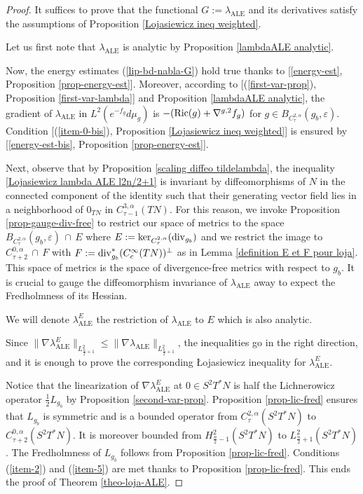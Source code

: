 \documentclass[a4paper,11pt,reqno]{amsart}
\def\Ric{\mathop{\rm Ric}\nolimits}
\def\div{\mathop{\rm div}\nolimits}
\def\Ric{\mathop{\rm Ric}\nolimits}
\def\div{\mathop{\rm div}\nolimits}
\numberwithin{equation}{section}
\begin{document}
	\begin{proof}
		It suffices to prove that the functional $G:=\lambda_{\operatorname{ALE}}$ and its derivatives satisfy the assumptions of Proposition \ref{Lojasiewicz ineq weighted}.
		
		Let us first note that $\lambda_{\operatorname{ALE}}$ is analytic by Proposition \ref{lambdaALE analytic}.
		
		Now, the energy estimates (\ref{lip-bd-nabla-G}) hold true thanks to [\eqref{energy-est}, Proposition \ref{prop-energy-est}]. 
		Moreover, according to [(\ref{first-var-prop}), Proposition \ref{first-var-lambda}] and Proposition \ref{lambdaALE analytic}, the gradient of $\lambda_{\operatorname{ALE}}$ in $L^2(e^{-f_g}d\mu_g)$ is $-(\Ric(g) + \nabla^{g,2}f_g)$ for $g\in B_{C^{2,\alpha}_{\tau}}(g_b,\varepsilon)$. Condition [(\ref{item-0-bis}), Proposition \ref{Lojasiewicz ineq weighted}] is ensured by [\eqref{energy-est-bis}, Proposition \ref{prop-energy-est}].
		
		Next, observe that by Proposition \ref{scaling diffeo tildelambda}, the inequality \eqref{Lojasiewicz lambda ALE l2n/2+1} is invariant by diffeomorphisms of $N$ in the connected component of the identity such that their generating vector field lies in a neighborhood of $0_{TN}$ in $C^{3,\alpha}_{\tau-1}(TN)$. For this reason, we invoke Proposition \ref{prop-gauge-div-free} to restrict our space of metrics to the space $B_{C^{2,\alpha}_{\tau}}(g_b,\varepsilon)\,\cap\,E$ where $E:= \ker_{C^{2,\alpha}_{\tau}}(\div_{g_b})$ and we restrict the image to $C^{0,\alpha}_{\tau+2}\,\cap \,F$ with $F:=\div^*_{g_b}(C^\infty_c(TN))^\perp$ as in Lemma \ref{definition E et F pour loja}.  This space of metrics is the space of divergence-free metrics with respect to $g_b$. It is crucial to gauge the diffeomorphism invariance of $\lambda_{\operatorname{ALE}}$ away to expect the Fredholmness of its Hessian. 
		
		We will denote $\lambda_{\operatorname{ALE}}^E$ the restriction of $\lambda_{\operatorname{ALE}}$ to $E$ which is also analytic. 
		
		Since $\|\nabla \lambda_{\operatorname{ALE}}^E\|_{L^2_{\frac{n}{2}+1}}\leq \|\nabla \lambda_{\operatorname{ALE}}\|_{L^2_{\frac{n}{2}+1}}$, the inequalities go in the right direction, and it is enough to prove the corresponding \L ojasiewicz inequality for $\lambda_{\operatorname{ALE}}^E$.
		
		Notice that the linearization of $\nabla \lambda_{\operatorname{ALE}}^E$ at $0\in S^2T^*N$ is half the Lichnerowicz operator $\frac{1}{2}L_{g_b}$ by Proposition \ref{second-var-prop}. Proposition \ref{prop-lic-fred} ensures that $L_{g_b}$ is symmetric and is a bounded operator from $C^{2,\alpha}_{\tau}(S^2T^*N)$ to $C^{0,\alpha}_{\tau+2}(S^2T^*N)$. It is moreover bounded from $H^2_{\frac{n}{2}-1}(S^2T^*N)$ to $L^2_{\frac{n}{2}+1}(S^2T^*N)$. The Fredholmness of $L_{g_b}$ follows from Proposition \ref{prop-lic-fred}. Conditions (\ref{item-2}) and (\ref{item-5}) are met thanks to Proposition \ref{prop-lic-fred}. This ends the proof of Theorem \ref{theo-loja-ALE}.
		
		
	\end{proof}
	
\end{document}
